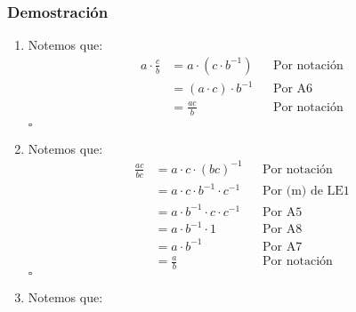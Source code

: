 \documentclass[11pt]{article}
\begin{document}
\subsubsection*{Demostración}

\begin{enumerate}[label=\alph*),font=\bfseries]


\item Notemos que:
\begin{align*}
    a \cdot \frac{c}{b} &= a \cdot \left( c \cdot b^{-1} \right) && \text{Por notación}\\
    &= \left( a \cdot c \right) \cdot b^{-1} && \text{Por A6}\\
    &= \frac{ac}{b} && \text{Por notación}\\
\end{align*}
\mbox{}\hfill $\square$


\item Notemos que:
\begin{align*}
    \frac{ac}{bc} &= a \cdot c \cdot \left( bc \right)^{-1} && \text{Por notación}\\
    &= a \cdot c \cdot b^{-1} \cdot c^{-1} && \text{Por (m) de LE1}\\
    &= a \cdot b^{-1} \cdot c \cdot c^{-1} && \text{Por A5}\\
    &= a \cdot b^{-1} \cdot 1 && \text{Por A8}\\
    &= a \cdot b^{-1} && \text{Por A7}\\
    &= \frac{a}{b} && \text{Por notación}
\end{align*}
\mbox{}\hfill $\square$


\item Notemos que:


\end{enumerate}
\end{document}
